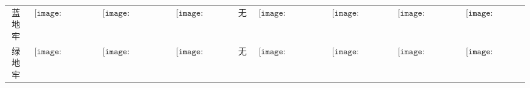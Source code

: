\begin{longtable}{|c|cccccccc|}
蓝地牢&$\begin{array}{c}\texttt{[image: figures/Blue\_Dungeon\_Candle.png]}\end{array}$&$\begin{array}{c}\texttt{[image: figures/Blue\_Dungeon\_Candelabra.png]}\end{array}$&$\begin{array}{c}\texttt{[image: figures/Blue\_Dungeon\_Lamp.png]}\end{array}$&无&$\begin{array}{c}\texttt{[image: figures/Blue\_Dungeon\_Chandelier.png]}\end{array}$&$\begin{array}{c}\texttt{[image: figures/Blue\_Dungeon\_Door.png]}\end{array}$&$\begin{array}{c}\texttt{[image: figures/Blue\_Dungeon\_Toilet.png]}\end{array}$&$\begin{array}{c}\texttt{[image: figures/Blue\_Dungeon\_Chest.png]}\end{array}$\\
绿地牢&$\begin{array}{c}\texttt{[image: figures/Green\_Dungeon\_Candle.png]}\end{array}$&$\begin{array}{c}\texttt{[image: figures/Green\_Dungeon\_Candelabra.png]}\end{array}$&$\begin{array}{c}\texttt{[image: figures/Green\_Dungeon\_Lamp.png]}\end{array}$&无&$\begin{array}{c}\texttt{[image: figures/Green\_Dungeon\_Chandelier.png]}\end{array}$&$\begin{array}{c}\texttt{[image: figures/Green\_Dungeon\_Door.png]}\end{array}$&$\begin{array}{c}\texttt{[image: figures/Green\_Dungeon\_Toilet.png]}\end{array}$&$\begin{array}{c}\texttt{[image: figures/Green\_Dungeon\_Chest.png]}\end{array}$\\

\end{longtable}
